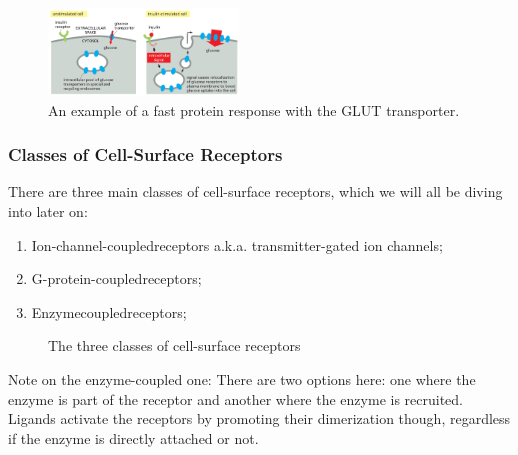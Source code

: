 \documentclass[../main.tex]{subfiles}
\begin{document}
\begin{figure}[H]
	\centering
	\includegraphics[width=0.45\textwidth]{GLUT_fast}
	\caption{An example of a fast protein response with the GLUT transporter.}
\end{figure}

\subsubsection{Classes of Cell-Surface Receptors}

There are three main classes of cell-surface receptors, which we will all be diving into later on:
\begin{enumerate}
	\item \gls{Ion-channel-coupledreceptors} a.k.a. transmitter-gated ion channels;
	\item \gls{G-protein-coupledreceptors};
	\item \gls{Enzymecoupledreceptors};
\end{enumerate}

\begin{figure}[h]
	\centering
	\hfill
		\hfill
	\caption{The three classes of cell-surface receptors}
\end{figure}
Note on the enzyme-coupled one: There are two options here: one where the enzyme is part of the receptor and another where the enzyme is recruited. Ligands activate the receptors by promoting their dimerization though, regardless if the enzyme is directly attached or not.
\end{document}
